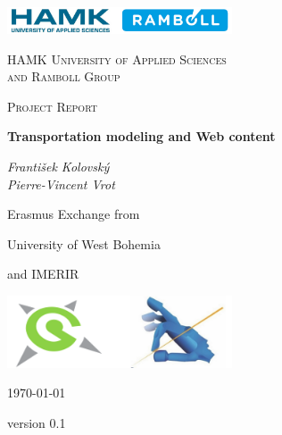 \documentclass[12pt, a4paper, final]{report}
\begin{document}

\begin{titlepage}

    \centering
    
    \includegraphics[width=0.5\textwidth]{./img/c00-main/hamk-ramboll.png}
    \par\vspace{1cm}
    {\scshape HAMK University of Applied Sciences \\ and Ramboll Group \par}
    \vspace{1cm}
    
    {\scshape\Large Project Report\par}
    \vspace{1.5cm}
    
    {\huge\bfseries Transportation modeling and Web content\par}
    \vspace{2cm}
    
    {\Large\itshape František Kolovský \\Pierre-Vincent Vrot\par}
    \vfill
    
    Erasmus Exchange from \par
    University of West Bohemia \par
    and IMERIR \par
    \includegraphics[width=0.5\textwidth]{./img/c00-main/geomatika-imerir.png} 
    \vfill
    
    {\large \today  \par version 0.1 \par}
    
\end{titlepage}

\setlength{\parskip}{1em}


\newpage
\null
\newpage
\end{document}
